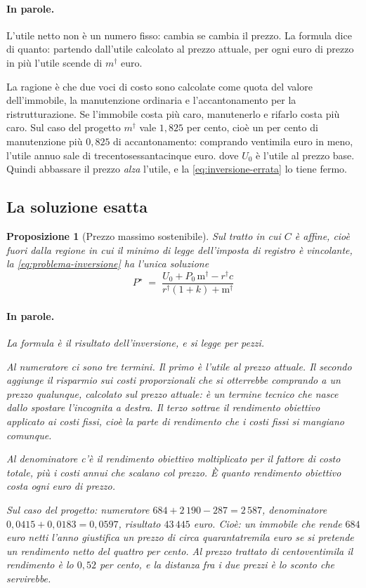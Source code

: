 \documentclass[11pt,a4paper]{article}
\theoremstyle{definition}
\theoremstyle{plain}
\newtheorem{proposizione}[definizione]{Proposizione}
\begin{document}
\paragraph{In parole.} L'utile netto non è un numero fisso: cambia se cambia il prezzo. La formula dice di quanto: partendo dall'utile calcolato al prezzo attuale, per ogni euro di prezzo in più l'utile scende di $m^\dagger$ euro.

La ragione è che due voci di costo sono calcolate come quota del valore dell'immobile, la manutenzione ordinaria e l'accantonamento per la ristrutturazione. Se l'immobile costa più caro, manutenerlo e rifarlo costa più caro. Sul caso del progetto $m^\dagger$ vale $1{,}825$ per cento, cioè un per cento di manutenzione più $0{,}825$ di accantonamento: comprando ventimila euro in meno, l'utile annuo sale di trecentosessantacinque euro.
dove $U_0$ è l'utile al prezzo base. Quindi abbassare il prezzo \emph{alza} l'utile, e la \eqref{eq:inversione-errata} lo tiene fermo.

\subsection{La soluzione esatta}

\begin{proposizione}[Prezzo massimo sostenibile]
Sul tratto in cui $C$ è affine, cioè fuori dalla regione in cui il minimo di legge dell'imposta di registro è vincolante, la \eqref{eq:problema-inversione} ha l'unica soluzione
\begin{equation}
\boxed{\;
P^\star \;=\; \frac{U_0 + P_0\,\mathrm{m}^\dagger - r^\dagger c}{r^\dagger (1+k) + \mathrm{m}^\dagger}\;}
\label{eq:pmax}
\end{equation}

\paragraph{In parole.} La formula è il risultato dell'inversione, e si legge per pezzi.

Al numeratore ci sono tre termini. Il primo è l'utile al prezzo attuale. Il secondo aggiunge il risparmio sui costi proporzionali che si otterrebbe comprando a un prezzo qualunque, calcolato sul prezzo attuale: è un termine tecnico che nasce dallo spostare l'incognita a destra. Il terzo sottrae il rendimento obiettivo applicato ai costi fissi, cioè la parte di rendimento che i costi fissi si mangiano comunque.

Al denominatore c'è il rendimento obiettivo moltiplicato per il fattore di costo totale, più i costi annui che scalano col prezzo. È quanto rendimento obiettivo costa ogni euro di prezzo.

Sul caso del progetto: numeratore $684 + 2\,190 - 287 = 2\,587$, denominatore $0{,}0415 + 0{,}0183 = 0{,}0597$, risultato $43\,445$ euro. Cioè: un immobile che rende $684$ euro netti l'anno giustifica un prezzo di circa quarantatremila euro se si pretende un rendimento netto del quattro per cento. Al prezzo trattato di centoventimila il rendimento è lo $0{,}52$ per cento, e la distanza fra i due prezzi è lo sconto che servirebbe.
\end{proposizione}
\end{document}
